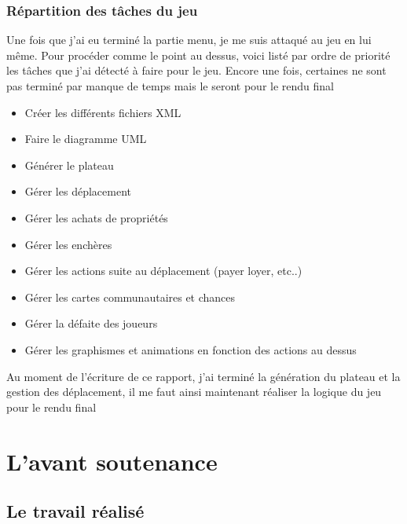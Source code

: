 \documentclass[12pt, openany]{report}
\begin{document}
    \section{Répartition des tâches du jeu}
    Une fois que j'ai eu terminé la partie menu, je me suis attaqué au jeu en lui même. Pour procéder comme le point au dessus, voici listé par ordre de priorité les tâches que j'ai détecté à faire pour le jeu. Encore une fois, certaines ne sont pas terminé par manque de temps mais le seront pour le rendu final
    \begin{itemize}
      \item Créer les différents fichiers XML
      \item Faire le diagramme UML
      \item Générer le plateau
      \item Gérer les déplacement
      \item Gérer les achats de propriétés
      \item Gérer les enchères
      \item Gérer les actions suite au déplacement (payer loyer, etc..)
      \item Gérer les cartes communautaires et chances
      \item Gérer la défaite des joueurs
      \item Gérer les graphismes et animations en fonction des actions au dessus
    \end{itemize}
    Au moment de l'écriture de ce rapport, j'ai terminé la génération du plateau et la gestion des déplacement, il me faut ainsi maintenant réaliser la logique du jeu pour le rendu final

\part{L'avant soutenance}
  \chapter{Le travail réalisé}
\end{document}

